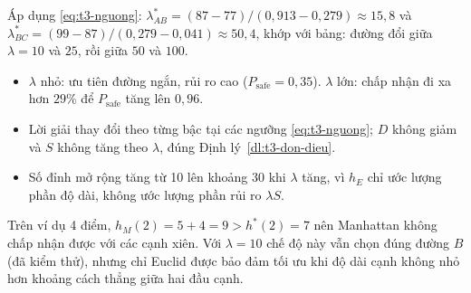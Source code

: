 Áp dụng \eqref{eq:t3-nguong}: $\lambda^\ast_{AB} = (87 - 77)/(0{,}913 - 0{,}279) \approx 15{,}8$ và
$\lambda^\ast_{BC} = (99 - 87)/(0{,}279 - 0{,}041) \approx 50{,}4$, khớp với bảng: đường đổi giữa
$\lambda = 10$ và $25$, rồi giữa $50$ và $100$.

\begin{ketqua}
  \begin{itemize}
    \item $\lambda$ nhỏ: ưu tiên đường ngắn, rủi ro cao ($P_{\text{safe}} = 0{,}35$).
          $\lambda$ lớn: chấp nhận đi xa hơn $29\%$ để $P_{\text{safe}}$ tăng lên $0{,}96$.
    \item Lời giải thay đổi theo từng bậc tại các ngưỡng \eqref{eq:t3-nguong}; $D$ không giảm và
          $S$ không tăng theo $\lambda$, đúng Định lý~\ref{dl:t3-don-dieu}.
    \item Số đỉnh mở rộng tăng từ 10 lên khoảng 30 khi $\lambda$ tăng, vì $h_E$ chỉ ước lượng phần
          độ dài, không ước lượng phần rủi ro $\lambda S$.
  \end{itemize}
\end{ketqua}

\begin{luuy}
  Trên ví dụ 4 điểm, $h_M(2) = 5 + 4 = 9 > h^\ast(2) = 7$ nên Manhattan không chấp nhận được với các
  cạnh xiên. Với $\lambda = 10$ chế độ này vẫn chọn đúng đường $B$ (đã kiểm thử), nhưng chỉ Euclid được bảo đảm
  tối ưu khi độ dài cạnh không nhỏ hơn khoảng cách thẳng giữa hai đầu cạnh.
\end{luuy}
